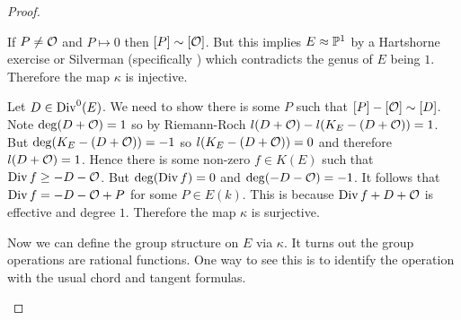 \documentclass[11pt]{article}
\begin{document}
\begin{proof}
\begin{enumerate}
		If $P\neq \mathcal{O}$ and $P\mapsto 0$ then $[P] \sim [\mathcal{O}]$. But this implies $E\approx \mathbb{P}^1$ by a Hartshorne exercise or Silverman (specifically \cite[Ex.~II.2.5]{silverman1}) which contradicts the genus of $E$ being $1$. Therefore the map $\kappa$ is injective.
		
		Let $D\in \operatorname{Div}^0(E)$. We need to show there is some $P$ such that $[P] - [\mathcal{O}] \sim [D]$. Note $\deg(D+\mathcal{O}) = 1$ so by Riemann-Roch $l(D+\mathcal{O}) - l(K_E - (D + \mathcal{O})) = 1$. But $\deg (K_E - (D+\mathcal{O})) = -1$ so $l(K_E - (D+\mathcal{O})) = 0$ and therefore $l(D+\mathcal{O}) = 1$. Hence there is some non-zero $f\in K(E)$ such that $\operatorname{Div} f \geq -D - \mathcal{O}$. But $\deg(\operatorname{Div} f) = 0$ and $\deg (-D - \mathcal{O}) = -1$. It follows that $\operatorname{Div} f = -D - \mathcal{O} + P$ for some $P\in E(k)$. This is because $\operatorname{Div} f + D + \mathcal{O}$ is effective and degree $1$. Therefore the map $\kappa$ is surjective.
		
		Now we can define the group structure on $E$ via $\kappa$. It turns out the group operations are rational functions. One way to see this is to identify the operation with the usual chord and tangent formulas.
	\end{enumerate}
\end{proof}
\end{document}
